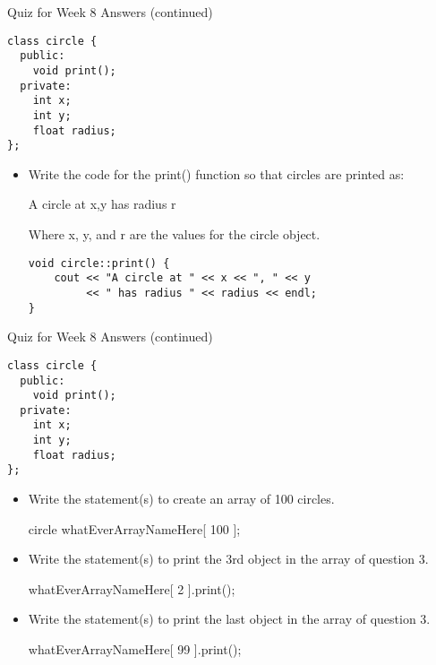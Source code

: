 \documentclass[presentation]{beamer}
\begin{document}
\begin{frame}[fragile,label=sec-4]{Quiz for Week 8 \alert{Answers} (continued)}
 \begin{verbatim}
class circle {
  public:
    void print();
  private:
    int x;
    int y;
    float radius;
};
\end{verbatim}
\begin{itemize}
\item Write the code for the print() function so that circles are printed as: 

\alert{A circle at x,y has radius r} 

Where x, y, and r are the values for the circle object.

\begin{verbatim}
void circle::print() {
    cout << "A circle at " << x << ", " << y
         << " has radius " << radius << endl;
}
\end{verbatim}
\end{itemize}
\end{frame}

\begin{frame}[fragile,label=sec-5]{Quiz for Week 8 \alert{Answers} (continued)}
 \begin{verbatim}
class circle {
  public:
    void print();
  private:
    int x;
    int y;
    float radius;
};
\end{verbatim}
\begin{itemize}
\item Write the statement(s) to create an array of 100 circles.

\alert{circle whatEverArrayNameHere[ 100 ];}
\item Write the statement(s) to print the 3rd object in the array of question 3.

\alert{whatEverArrayNameHere[ 2 ].print();}
\item Write the statement(s) to print the last object in the array of question 3.

\alert{whatEverArrayNameHere[ 99 ].print();}
\end{itemize}
\end{frame}
\end{document}
